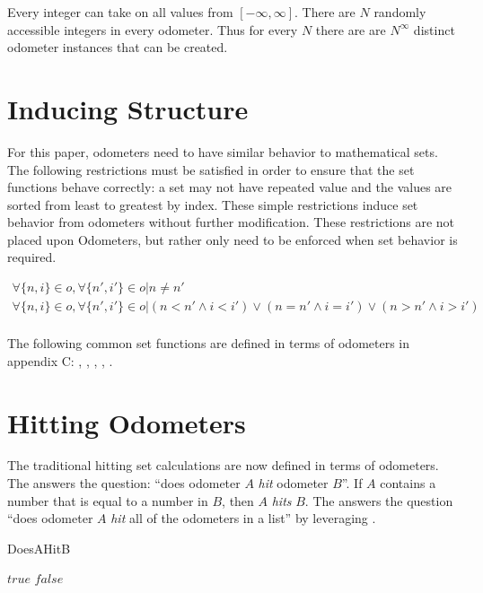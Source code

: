 Every integer can take on all values from $[-\infty,\infty]$. There are $N$ randomly accessible integers in every odometer. Thus for every  $N$ there are are $N^{\infty}$ distinct  odometer instances that can be created.


\section{Inducing Structure}

For this paper, odometers need to have similar behavior to mathematical sets. The following restrictions must be satisfied in order to ensure that the set functions behave correctly: a set may not have repeated value and the values are sorted from least to greatest by index. These simple restrictions induce set behavior from odometers without further modification. These restrictions are not placed upon Odometers, but rather only need to be enforced when set behavior is required.

\begin{equation*}
\begin{matrix}
\forall \{n,i\} \in o, \forall \{n',i'\} \in o | n \neq n' \\
\forall \{n,i\} \in o, \forall \{n',i'\} \in o | (n < n' \wedge i < i') \vee (n = n' \wedge i = i') \vee (n > n' \wedge i > i') \\
\end{matrix}
\end{equation*}

The following common set functions are defined in terms of odometers in appendix C: 
, , , , .

\section{Hitting Odometers}

The traditional hitting set calculations are now defined in terms of odometers. The  answers the question: ``does odometer $A$ \textit{hit} odometer $B$''. If $A$ contains a number that is equal to a number in $B$, then $A$ \textit{hits} $B$. The  answers the question ``does odometer $A$ \textit{hit} all of the odometers in a list'' by leveraging .

\begin{algorithm}[H]
    \centering
	\caption{DoesAHitB}\label{DoesAHitB}
	\begin{algorithmic}[1]
		\State \Return $true$
		\EndIf
		\EndFor
		\EndFor
		\State \Return $false$
		\EndFunction
	\end{algorithmic}
\end{algorithm}

